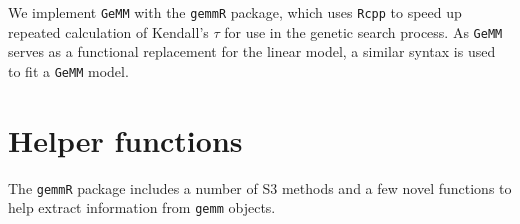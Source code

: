 \documentclass{article}\usepackage[]{graphicx}\usepackage[]{color}
\begin{document}
We implement \texttt{GeMM} with the \texttt{gemmR} package, which uses \texttt{Rcpp} to speed up repeated calculation of Kendall's $\tau$ for use in the genetic search process.
As \texttt{GeMM} serves as a functional replacement for the linear model, a similar syntax is used to fit a \texttt{GeMM} model.


\section*{Helper functions}

The \texttt{gemmR} package includes a number of S3 methods and a few novel functions to help extract information from \texttt{gemm} objects.




\end{document}
